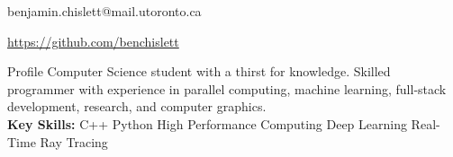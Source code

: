 \documentclass[11pt, letterpaper]{article}
\title{}
\author{Benjamin Chislett}
\date{}
\newcommand{\vbar}{\textbar\xspace}
\begin{document}
\begin{center}
  \Huge\theauthor
  \par
  \large{benjamin.chislett@mail.utoronto.ca}
  \par
  \large\url{https://github.com/benchislett}
\end{center}

\begin{section}{Profile}
Computer Science student with a thirst for knowledge.
Skilled programmer with experience in parallel computing, machine learning, full-stack development, research, and computer graphics.
\\

\textbf{Key Skills:} C++ \vbar Python \vbar High Performance Computing \vbar Deep Learning \vbar Real-Time Ray Tracing

\end{section}
\end{document}
